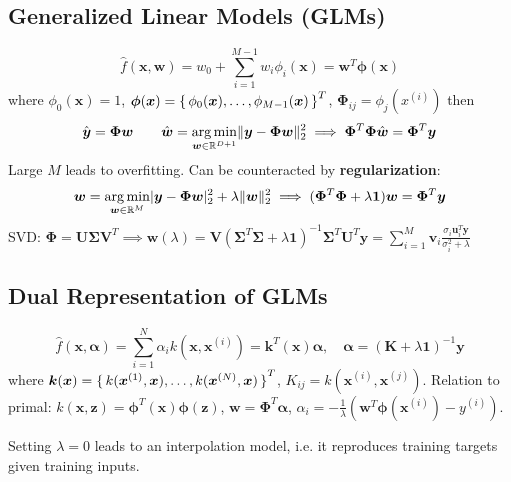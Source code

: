 \documentclass[twocolumn, 8pt]{extarticle}
\begin{document}
\subsection{Generalized Linear Models (GLMs)} %

\[
    \hat f(\bm x, \bm w) = w_0 + \sum _{i = 1}^{M - 1} w_i\phi _i(\bm x) = \bm w^T\bm\phi(\bm x)
\]
where \(\phi_0(\bm x) = 1\), \(\bm \phi(\bm x) = \set{\phi_0(\bm x), \dots, \phi _{M - 1}(\bm x)}^T\),
\(\bm \Phi_{ij} = \phi _j(x^{(i)})\) then
\[
    \hat{\bm y} = \bm \Phi\bm w \qquad \hat{\bm w} = \operatorname*{arg\,min} _{\bm w \in \mathbb{R}^{D + 1}} \lVert\bm y - \bm \Phi\bm w\rVert_2^2
    \implies \bm \Phi^T\bm \Phi\hat{\bm w} = \bm \Phi^T\bm y
\]
Large \(M\) leads to overfitting. Can be counteracted by \textbf{regularization}:
\[
    \bm w = \operatorname*{arg\,min} _{\bm w \in \mathbb{R}^{M}} \lvert\bm y - \bm \Phi\bm w\rvert_2^2 + \lambda\lVert\bm w\rVert_2^2
    \implies (\bm\Phi^T\bm\Phi + \lambda\bm 1)\bm w = \bm\Phi^T\bm y
\]
SVD: \(\bm\Phi = \bm U\bm\Sigma\bm V^T \implies \bm w(\lambda) = \bm V(\bm\Sigma^T\bm\Sigma + \lambda\bm 1)^{-1}\bm\Sigma^T\bm U^T\bm y = \sum _{i = 1}^M \bm v_i\frac{\sigma _i\bm u_i^T\bm y}{\sigma _i^2 + \lambda}\)

\subsection{Dual Representation of GLMs} %

\[
    \hat f(\bm x, \bm \alpha) = \sum _{i = 1}^N \alpha _ik(\bm x, \bm x^{(i)}) = \bm k^T(\bm x)\bm\alpha, \quad \bm\alpha = (\bm K + \lambda\bm 1)^{-1}\bm y
\]
where \(\bm k(\bm x) = \set{k(\bm x^{(1)}, \bm x), \dots, k(\bm x^{(N)}, \bm x)}^T\), \(K_{ij} = k(\bm x^{(i)}, \bm x^{(j)})\).
Relation to primal: \(k(\bm x, \bm z) = \bm \phi^T(\bm x)\bm\phi(\bm z)\), \(\bm w = \bm\Phi^T\bm\alpha\),
\(\alpha _i = -\frac{1}{\lambda}(\bm w^T\bm\phi(\bm x^{(i)}) - y^{(i)})\).

Setting \(\lambda = 0\) leads to an interpolation model, i.e. it reproduces training targets given training inputs.
\end{document}
